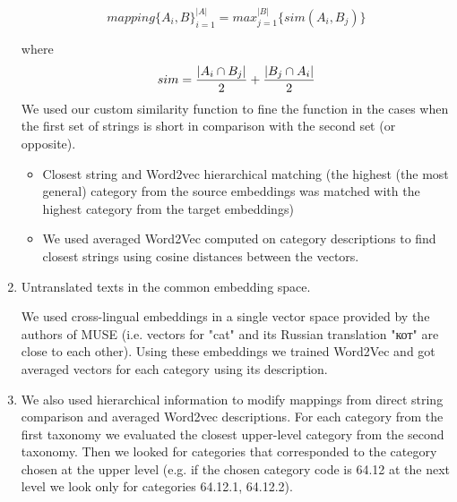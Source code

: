 \documentclass[11pt,a4paper]{article}
\begin{document}
\begin{enumerate}
	$$mapping\{A_i, B\}_{i=1}^{|A|} = max_{j=1}^{|B|}\{sim(A_i,B_j)\}$$
	
	where $$sim = \dfrac{|A_i \cap B_j|}{2} + \\ \dfrac{|B_j \cap A_i|}{2} $$
	We used our custom similarity function to fine the function in the cases when the first set of strings is short in comparison with the second set (or opposite).
	\begin{itemize}
		\item Closest string and Word2vec hierarchical matching (the highest (the most general) category from the source embeddings was matched with the highest category from the target embeddings)
		\item We used averaged Word2Vec computed on category descriptions  to find closest strings using cosine distances between the vectors.
	\end{itemize}
	\item Untranslated texts in the common embedding space.
	
	We used cross-lingual embeddings in a single vector space provided by the authors of MUSE (i.e. vectors for "cat" and its Russian translation \foreignlanguage{russian}{"кот"} are close to each other). Using these embeddings we trained Word2Vec and got averaged vectors for each category using its description.
	\item We also used hierarchical information to modify mappings from direct string comparison and averaged Word2vec descriptions. For each category from the first taxonomy we evaluated the closest upper-level category from the second taxonomy. Then we looked for categories that corresponded to the category chosen at the upper level (e.g. if the chosen category code is 64.12 at the next level we look only for categories 64.12.1, 64.12.2).
\end{enumerate}
\end{document}
